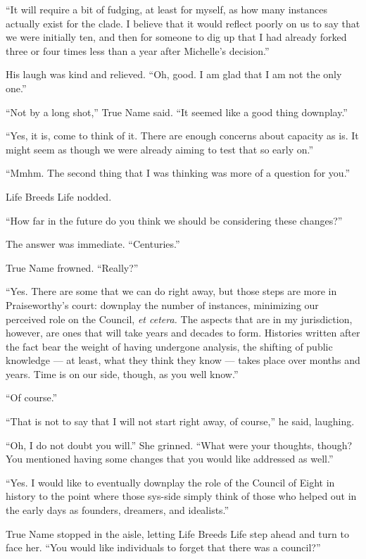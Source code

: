 ``It will require a bit of fudging, at least for myself, as how many instances actually exist for the clade. I believe that it would reflect poorly on us to say that we were initially ten, and then for someone to dig up that I had already forked three or four times less than a year after Michelle's decision.''

His laugh was kind and relieved. ``Oh, good. I am glad that I am not the only one.''

``Not by a long shot,'' True Name said. ``It seemed like a good thing downplay.''

``Yes, it is, come to think of it. There are enough concerns about capacity as is. It might seem as though we were already aiming to test that so early on.''

``Mmhm. The second thing that I was thinking was more of a question for you.''

Life Breeds Life nodded.

``How far in the future do you think we should be considering these changes?''

The answer was immediate. ``Centuries.''

True Name frowned. ``Really?''

``Yes. There are some that we can do right away, but those steps are more in Praiseworthy's court: downplay the number of instances, minimizing our perceived role on the Council, \emph{et cetera.} The aspects that are in my jurisdiction, however, are ones that will take years and decades to form. Histories written after the fact bear the weight of having undergone analysis, the shifting of public knowledge — at least, what they think they know — takes place over months and years. Time is on our side, though, as you well know.''

``Of course.''

``That is not to say that I will not start right away, of course,'' he said, laughing.

``Oh, I do not doubt you will.'' She grinned. ``What were your thoughts, though? You mentioned having some changes that you would like addressed as well.''

``Yes. I would like to eventually downplay the role of the Council of Eight in history to the point where those sys-side simply think of those who helped out in the early days as founders, dreamers, and idealists.''

True Name stopped in the aisle, letting Life Breeds Life step ahead and turn to face her. ``You would like individuals to forget that there was a council?''

